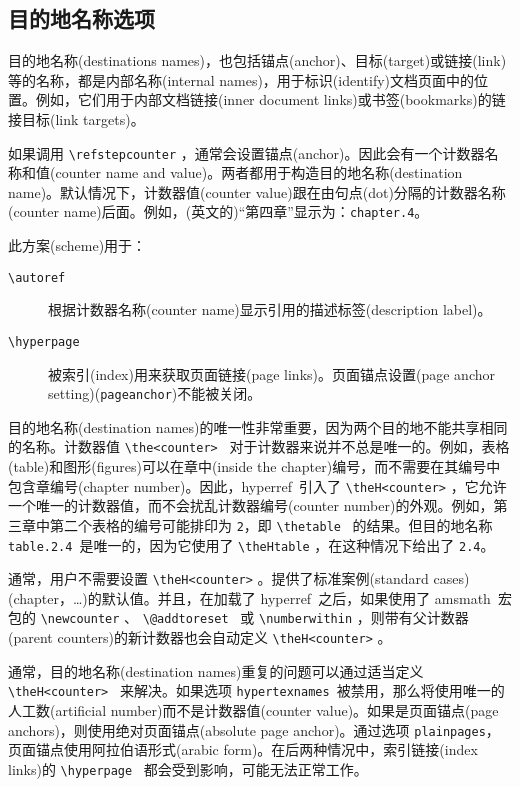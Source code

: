 \documentclass{article}
\newcommand*{\cs}[1]{%
  \texttt{\textbackslash #1}%
}
\newcommand*{\xpackage}[1]{\textsf{#1}}
\begin{document}
\subsection[目的地名称选项]{\heiti 目的地名称选项}

目的地名称(destinations names)，也包括锚点(anchor)、目标(target)或链接(link)等的名称，都是内部名称(internal names)，用于标识(identify)文档页面中的位置。例如，它们用于内部文档链接(inner document links)或书签(bookmarks)的链接目标(link targets)。

如果调用 \cs{refstepcounter}，通常会设置锚点(anchor)。因此会有一个计数器名称和值(counter name and value)。两者都用于构造目的地名称(destination name)。默认情况下，计数器值(counter value)跟在由句点(dot)分隔的计数器名称(counter name)后面。例如，(英文的)“第四章”显示为：\verb|chapter.4|。{}

此方案(scheme)用于：
\begin{description}
    \item[\cs{autoref}] 根据计数器名称(counter name)显示引用的描述标签(description label)。
    \item[\cs{hyperpage}] 被索引(index)用来获取页面链接(page links)。页面锚点设置(page anchor setting)(\verb|pageanchor|)不能被关闭。
\end{description}

目的地名称(destination names)的唯一性非常重要，因为两个目的地不能共享相同的名称。计数器值 \cs{the<counter>}\ 对于计数器来说并不总是唯一的。例如，表格(table)和图形(figures)可以在章中(inside the chapter)编号，而不需要在其编号中包含章编号(chapter number)。因此，\xpackage{hyperref}\ 引入了 \cs{theH<counter>}，它允许一个唯一的计数器值，而不会扰乱计数器编号(counter number)的外观。例如，第三章中第二个表格的编号可能排印为 \texttt{2}，即 \cs{thetable}\ 的结果。但目的地名称 \texttt{table.2.4}\ 是唯一的，因为它使用了 \cs{theHtable}，在这种情况下给出了 \verb|2.4|。

通常，用户不需要设置 \cs{theH<counter>}。提供了标准案例(standard cases)(chapter，\dots)的默认值。并且，在加载了 \xpackage{hyperref}\ 之后，如果使用了 \xpackage{amsmath}\ 宏包的 \cs{newcounter}、\cs{@addtoreset}\ 或 \cs{numberwithin}，则带有父计数器(parent counters)的新计数器也会自动定义 \cs{theH<counter>}。

通常，目的地名称(destination names)重复的问题可以通过适当定义 \cs{theH<counter>}\ 来解决。如果选项 \texttt{hypertexnames}\ 被禁用，那么将使用唯一的人工数(artificial number)而不是计数器值(counter value)。如果是页面锚点(page anchors)，则使用绝对页面锚点(absolute page anchor)。通过选项 \texttt{plainpages}，页面锚点使用阿拉伯语形式(arabic form)。在后两种情况中，索引链接(index links)的 \cs{hyperpage}\ 都会受到影响，可能无法正常工作。
\end{document}
